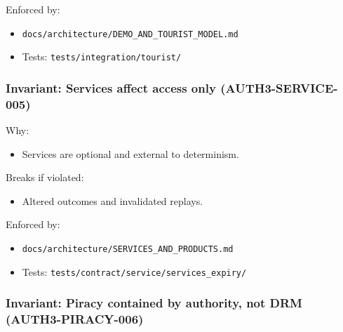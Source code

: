 \documentclass[9pt,a4paper,openany]{book}
\begin{document}
Enforced by:



\begin{itemize}
\item \texttt{docs/\allowbreak{}architecture/\allowbreak{}DEMO\_\allowbreak{}AND\_\allowbreak{}TOURIST\_\allowbreak{}MODEL.\allowbreak{}md}
\end{itemize}


\begin{itemize}
\item Tests: \texttt{tests/\allowbreak{}integration/\allowbreak{}tourist/\allowbreak{}}
\end{itemize}





\subsubsection{Invariant: Services affect access only (AUTH3-SERVICE-005)}


Why:



\begin{itemize}
\item Services are optional and external to determinism.\allowbreak{}
\end{itemize}


Breaks if violated:



\begin{itemize}
\item Altered outcomes and invalidated replays.\allowbreak{}
\end{itemize}


Enforced by:



\begin{itemize}
\item \texttt{docs/\allowbreak{}architecture/\allowbreak{}SERVICES\_\allowbreak{}AND\_\allowbreak{}PRODUCTS.\allowbreak{}md}
\end{itemize}


\begin{itemize}
\item Tests: \texttt{tests/\allowbreak{}contract/\allowbreak{}service/\allowbreak{}services\_\allowbreak{}expiry/\allowbreak{}}
\end{itemize}





\subsubsection{Invariant: Piracy contained by authority, not DRM (AUTH3-PIRACY-006)}
\end{document}
